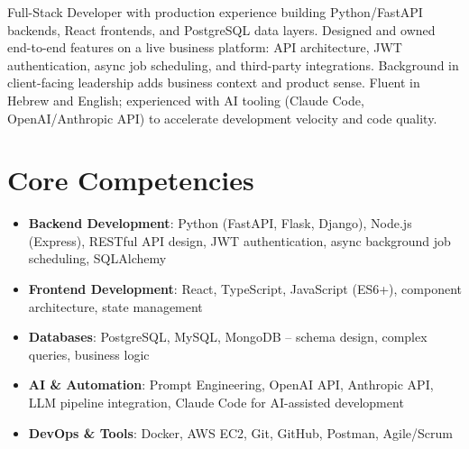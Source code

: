 \documentclass[11pt,a4paper,sans]{moderncv}
\begin{document}
\makecvtitle


\vspace{6pt}
\small{Full-Stack Developer with production experience building Python/FastAPI backends, React frontends, and PostgreSQL data layers. Designed and owned end-to-end features on a live business platform: API architecture, JWT authentication, async job scheduling, and third-party integrations. Background in client-facing leadership adds business context and product sense. Fluent in Hebrew and English; experienced with AI tooling (Claude Code, OpenAI/Anthropic API) to accelerate development velocity and code quality.}


\section{Core Competencies}
\vspace{1pt}
\begin{itemize}

\item \textbf{Backend Development}: Python (FastAPI, Flask, Django), Node.js (Express), RESTful API design, JWT authentication, async background job scheduling, SQLAlchemy

\item \textbf{Frontend Development}: React, TypeScript, JavaScript (ES6+), component architecture, state management

\item \textbf{Databases}: PostgreSQL, MySQL, MongoDB -- schema design, complex queries, business logic

\item \textbf{AI \& Automation}: Prompt Engineering, OpenAI API, Anthropic API, LLM pipeline integration, Claude Code for AI-assisted development

\item \textbf{DevOps \& Tools}: Docker, AWS EC2, Git, GitHub, Postman, Agile/Scrum

\end{itemize}

\end{document}
